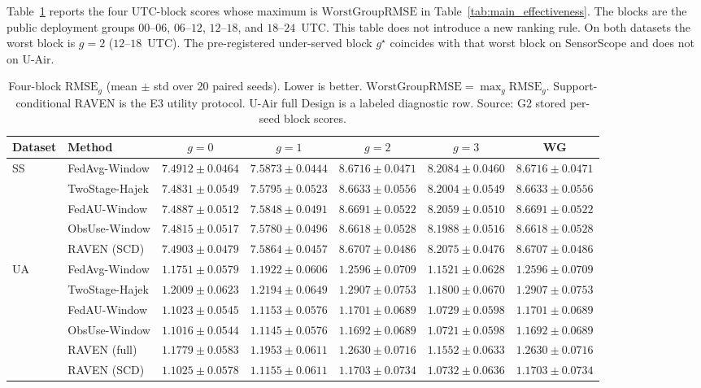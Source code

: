 Table~\ref{tab:app_block_rmse} reports the four UTC-block scores whose
maximum is $\mathrm{WorstGroupRMSE}$ in
Table~\ref{tab:main_effectiveness}.  The blocks are the public
deployment groups $00$--$06$, $06$--$12$, $12$--$18$, and $18$--$24$~UTC.
This table does not introduce a new ranking rule.  On both datasets the
worst block is $g=2$ ($12$--$18$~UTC).  The pre-registered under-served
block $g^{\star}$ coincides with that worst block on SensorScope and
does not on U-Air.

\begin{table}[!t]
\centering
\caption{Four-block $\mathrm{RMSE}_g$ (mean $\pm$ std over 20 paired
seeds).  Lower is better.  $\mathrm{WorstGroupRMSE}=\max_g\mathrm{RMSE}_g$.
Support-conditional RAVEN is the E3 utility protocol.  U-Air full Design is a labeled
diagnostic row.  Source: G2 stored per-seed block scores.}
\label{tab:app_block_rmse}
\scriptsize
\setlength{\tabcolsep}{2.2pt}
\begin{tabular*}{\columnwidth}{@{\extracolsep{\fill}}llccccc}
\toprule
Dataset & Method & $g{=}0$ & $g{=}1$ & $g{=}2$ & $g{=}3$ & WG\\
\midrule
\multirow{5}{*}{SS}
& FedAvg-Window & $7.4912{\pm}0.0464$ & $7.5873{\pm}0.0444$ & $8.6716{\pm}0.0471$ & $8.2084{\pm}0.0460$ & $8.6716{\pm}0.0471$\\
& TwoStage-Hajek & $7.4831{\pm}0.0549$ & $7.5795{\pm}0.0523$ & $8.6633{\pm}0.0556$ & $8.2004{\pm}0.0549$ & $8.6633{\pm}0.0556$\\
& FedAU-Window & $7.4887{\pm}0.0512$ & $7.5848{\pm}0.0491$ & $8.6691{\pm}0.0522$ & $8.2059{\pm}0.0510$ & $8.6691{\pm}0.0522$\\
& ObsUse-Window & $7.4815{\pm}0.0517$ & $7.5780{\pm}0.0496$ & $8.6618{\pm}0.0528$ & $8.1988{\pm}0.0516$ & $8.6618{\pm}0.0528$\\
& RAVEN (SCD) & $7.4903{\pm}0.0479$ & $7.5864{\pm}0.0457$ & $8.6707{\pm}0.0486$ & $8.2075{\pm}0.0476$ & $8.6707{\pm}0.0486$\\
\midrule
\multirow{6}{*}{UA}
& FedAvg-Window & $1.1751{\pm}0.0579$ & $1.1922{\pm}0.0606$ & $1.2596{\pm}0.0709$ & $1.1521{\pm}0.0628$ & $1.2596{\pm}0.0709$\\
& TwoStage-Hajek & $1.2009{\pm}0.0623$ & $1.2194{\pm}0.0649$ & $1.2907{\pm}0.0753$ & $1.1800{\pm}0.0670$ & $1.2907{\pm}0.0753$\\
& FedAU-Window & $1.1023{\pm}0.0545$ & $1.1153{\pm}0.0576$ & $1.1701{\pm}0.0689$ & $1.0729{\pm}0.0598$ & $1.1701{\pm}0.0689$\\
& ObsUse-Window & $1.1016{\pm}0.0544$ & $1.1145{\pm}0.0576$ & $1.1692{\pm}0.0689$ & $1.0721{\pm}0.0598$ & $1.1692{\pm}0.0689$\\
& RAVEN (full) & $1.1779{\pm}0.0583$ & $1.1953{\pm}0.0611$ & $1.2630{\pm}0.0716$ & $1.1552{\pm}0.0633$ & $1.2630{\pm}0.0716$\\
& RAVEN (SCD) & $1.1025{\pm}0.0578$ & $1.1155{\pm}0.0611$ & $1.1703{\pm}0.0734$ & $1.0732{\pm}0.0636$ & $1.1703{\pm}0.0734$\\
\bottomrule
\end{tabular*}
\end{table}

